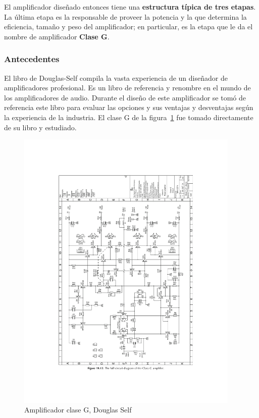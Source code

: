 \documentclass[a4paper,12pt,twoside]{article}
\begin{document}
El amplificador diseñado entonces tiene una \textbf{estructura típica de tres etapas}. La última etapa es la responsable de proveer la potencia y la que determina la eficiencia, tamaño y peso del amplificador; en particular, es la etapa que le da el nombre de amplificador \textbf{Clase G}.

\subsubsection{Antecedentes}

El libro de Douglas-Self compila la vasta experiencia de un diseñador de amplificadores profesional. Es un libro de referencia y renombre en el mundo de los amplificadores de audio. Durante el diseño de este amplificador se tomó de referencia este libro para evaluar las opciones y sus ventajas y desventajas según la experiencia de la industria. El clase G de la figura~\ref{fig:ampli_DS} fue tomado directamente de su libro y estudiado. 

\begin{figure}[H]
	\centering
	\includegraphics[width=0.95\textwidth]{img/clase_g_del_libro.pdf}
	\caption{Amplificador clase G, Douglas Self}
	\label{fig:ampli_DS}
\end{figure}
\end{document}
